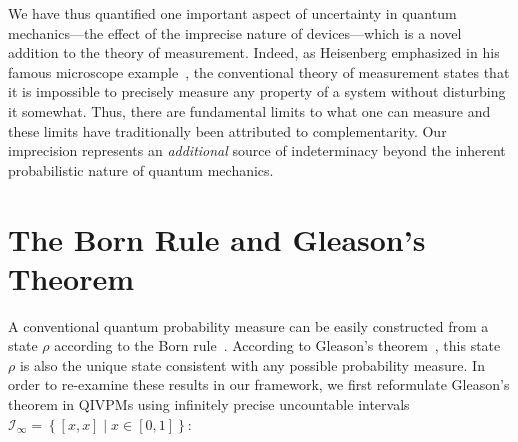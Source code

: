 \documentclass[english,reprint, aps, prl,superscriptaddress, showpacs,
showkeys, longbibliography, amsmath, amssymb, floatfix]{revtex4-1}
\theoremstyle{plain}
\theoremstyle{definition}
\newcommand{\set}[2]{\ensuremath{\left\{ {#1}\mathrel{}\middle|\mathrel{}{#2}\right\} }}
\newcommand{\andy}[1]{\fbox{\begin{minipage}{0.9\linewidth}\color{blue}{Andy says: #1}\end{minipage}}}
\begin{document}
We have thus quantified one important aspect of uncertainty in quantum
mechanics---the effect of the imprecise nature of devices---which is a novel
addition to the theory of measurement. Indeed, as Heisenberg
emphasized in his famous microscope
example~\cite{Heisenberg1983apsrev4}, the conventional theory
of measurement states that it is impossible to precisely measure any
property of a system without disturbing it somewhat. Thus, there are
fundamental limits to what one can measure and these limits have traditionally 
been attributed to complementarity. Our imprecision represents an 
\emph{additional} source of indeterminacy beyond the inherent probabilistic nature
of quantum mechanics.




\section{The Born Rule and Gleason's Theorem}

\label{sec:Gleason}

A conventional quantum probability measure can be easily constructed
from a state $\rho$ according to the Born
rule~\citep{Born1983bibTeX,Mermin2007,Jaeger2007}.  According
to Gleason's
theorem~\citep{gleason1957,Redhead1987-REDINA,peres1995quantum}, this
state $\rho$ is also the unique state consistent with any possible
probability measure. In order to re-examine these results in our
framework, we first reformulate Gleason's theorem in QIVPMs using
infinitely precise uncountable
intervals~$\mathscr{I}_{\infty}=\set{\left[x,x\right]}{x\in\left[0,1\right]}$:
\end{document}
